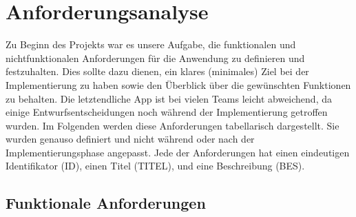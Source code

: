 \chapter{Anforderungsanalyse}
\label{cha:anforderungsanalyse}
Zu Beginn des Projekts war es unsere Aufgabe, die funktionalen und nichtfunktionalen Anforderungen für die Anwendung zu definieren und festzuhalten. Dies sollte dazu dienen, ein klares (minimales) Ziel bei der Implementierung zu haben sowie den Überblick über die gewünschten Funktionen zu behalten. Die letztendliche App ist bei vielen Teams leicht abweichend, da einige Entwurfsentscheidungen noch während der Implementierung getroffen wurden.
Im Folgenden werden diese Anforderungen tabellarisch dargestellt. Sie wurden genauso definiert und nicht während oder nach der Implementierungsphase angepasst. Jede der Anforderungen hat einen eindeutigen Identifikator (ID), einen Titel (TITEL), und eine Beschreibung (BES).

\section{Funktionale Anforderungen}
\label{sec:anforderungsanalyse:funktional}

